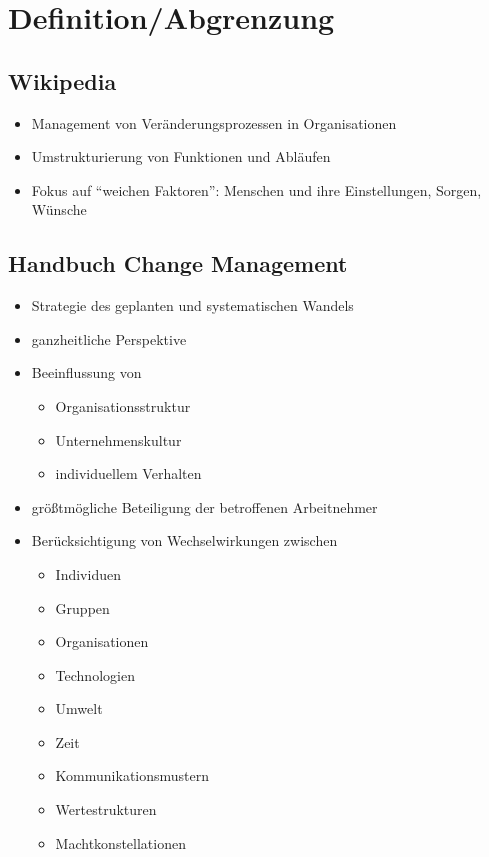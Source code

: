 \documentclass[a4paper, 12pt]{article}
\begin{document}
\tableofcontents
\pagebreak



\section{Definition/Abgrenzung}


\subsection{Wikipedia}
\begin{itemize}
  \item Management von Veränderungsprozessen in Organisationen
  \item Umstrukturierung von Funktionen und Abläufen
  \item Fokus auf ``weichen Faktoren'': Menschen und ihre Einstellungen, Sorgen, Wünsche
\end{itemize}


\subsection{Handbuch Change Management}
\begin{itemize}
  \item Strategie des geplanten und systematischen Wandels
  \item ganzheitliche Perspektive
  \item Beeinflussung von
    \begin{itemize}
      \item Organisationsstruktur
      \item Unternehmenskultur
      \item individuellem Verhalten
    \end{itemize}
  \item größtmögliche Beteiligung der betroffenen Arbeitnehmer
  \item Berücksichtigung von Wechselwirkungen zwischen
    \begin{itemize}
      \item Individuen
      \item Gruppen
      \item Organisationen
      \item Technologien
      \item Umwelt
      \item Zeit
      \item Kommunikationsmustern
      \item Wertestrukturen
      \item Machtkonstellationen
    \end{itemize}
\end{itemize}
\end{document}

